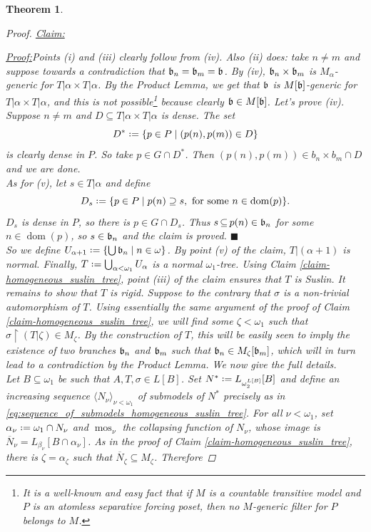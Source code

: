 \documentclass[11pt,a4paper]{report}
\newtheorem{theorem}{Theorem}[chapter] %
\theoremstyle{definition}
\theoremstyle{num.custom-title}
\theoremstyle{custom-title}
\newenvironment{claim}[1]{\par\noindent\underline{Claim#1:}\space}{} %
\newenvironment{claimproof}[1]{\par\noindent\underline{Proof:}\space#1}{\leavevmode\unskip\penalty9999 \hbox{}\nobreak\hfill\quad\hbox{$\blacksquare$}} %
\DeclareMathOperator{\dom}{dom}
\DeclareMathOperator{\sse}{\subseteq}
\DeclareMathOperator{\restr}{\upharpoonright}
\DeclareMathOperator{\mos}{mos}
\newcommand{\ol}{\overline}
\newcommand*{\defeq}{\mathrel{\rlap{%
                     \raisebox{0.3ex}{$\cdot$}}%
                     \raisebox{-0.3ex}{$\cdot$}}%
                     =}
\begin{document}
\begin{theorem}
\begin{proof}
\begin{claim}{}
\begin{claimproof}
Points (i) and (iii) clearly follow from (iv). Also (ii) does: take $n \neq m$  and suppose towards a contradiction that $\mathfrak{b}_n = \mathfrak{b}_m = \mathfrak{b}$. By (iv), $\mathfrak{b}_n \times \mathfrak{b}_m$ is $M_\alpha$-generic for $T|\alpha \times T|\alpha$. By the Product Lemma, we get that $\mathfrak{b}$ is $M[\mathfrak{b}]$-generic for $T|\alpha \times T|\alpha$, and this is not possible\footnote{It is a well-known and easy fact that if $M$ is a countable transitive model and $P$ is an atomless separative forcing poset, then no $M$-generic filter for $P$ belongs to $M$.} because clearly $\mathfrak{b} \in M[\mathfrak{b}]$. Let's prove (iv). Suppose $n \neq m$ and $D \sse T|\alpha \times T|\alpha$ is dense. The set
\[
D^* \defeq \{p \in P \mid (p(n),p(m)) \in D\}
\]
is clearly dense in $P$. So take $p \in G \cap D^*$. Then $(p(n),p(m)) \in b_n \times b_m \cap D$ and we are done.\\
As for (v), let $s \in T|\alpha$ and define
\[
D_s \defeq \{p \in P \mid p(n) \supseteq s, \text{ for some } n \in \dom(p)\}.
\]
$D_s$ is dense in $P$, so there is $p \in G \cap D_s$. Thus $s \sse p(n) \in \b_n$ for some $n \in \dom(p)$, so $s \in \mathfrak{b}_n$ and the claim is proved.
\end{claimproof}
\end{claim}\\[10pt]
So we define $U_{\alpha+1} \defeq \{\bigcup \b_n \mid n \in \omega\}$. By point (v) of the claim, $T|(\alpha+1)$ is normal. Finally, $T \defeq \bigcup_{\alpha < \omega_1} U_\alpha$ is a normal $\omega_1$-tree. Using Claim \ref{claim-homogeneous_suslin_tree}, point (iii) of the claim ensures that $T$ is Suslin. It remains to show that $T$ is rigid. Suppose to the contrary that $\sigma$ is a non-trivial automorphism of $T$. Using essentially the same argument of the proof of Claim \ref{claim-homogeneous_suslin_tree}, we will find some $\zeta < \omega_1$ such that $\sigma \restr (T|\zeta) \in M_\zeta$. By the construction of $T$, this will be easily seen to imply the existence of two branches $\mathfrak{b}_n$ and $\mathfrak{b}_m$ such that $\mathfrak{b}_n \in M_\zeta[\mathfrak{b}_m]$, which will in turn lead to a contradiction by the Product Lemma. We now give the full details.\\
Let $B \sse \omega_1$ be such that $A, T, \sigma \in L[B]$. Set $N^* \defeq L_{\omega_2^{L[B]}}[B]$ and define an increasing sequence $\langle N_\nu \rangle_{\nu < \omega_1}$ of submodels of $N^*$ precisely as in \eqref{eq:sequence_of_submodels_homogeneous_suslin_tree}. For all $\nu < \omega_1$, set $\alpha_\nu \defeq \omega_1 \cap N_\nu$ and $\mos_\nu$ the collapsing function of $N_\nu$, whose image is $\ol{N}_\nu = L_{\beta_\nu}[B \cap \alpha_\nu]$. As in the proof of Claim \ref{claim-homogeneous_suslin_tree}, there is $\zeta = \alpha_\zeta$ such that $\ol{N}_\zeta \sse M_\zeta$. Therefore

\end{proof}
\end{theorem}
\end{document}
